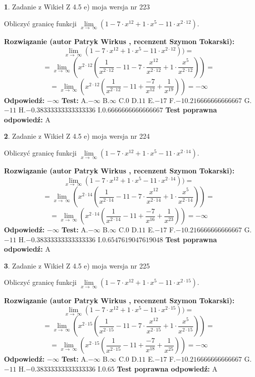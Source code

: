 \documentclass[12pt, a4paper]{article}
\theoremstyle{definition} %
\newtheorem{zad}{}
\newcommand{\zadStart}[1]{\begin{zad}#1\newline}
\newcommand{\zadStop}{\end{zad}}
\newcommand{\rozwStart}[2]{\noindent \textbf{Rozwiązanie (autor #1 , recenzent #2): }\newline}
\newcommand{\rozwStop}{\newline}
\newcommand{\odpStart}{\noindent \textbf{Odpowiedź:}\newline}
\newcommand{\odpStop}{\newline}
\newcommand{\testStart}{\noindent \textbf{Test:}\newline}
\newcommand{\testStop}{\newline}
\newcommand{\kluczStart}{\noindent \textbf{Test poprawna odpowiedź:}\newline}
\newcommand{\kluczStop}{\newline}
\begin{document}
\zadStart{Zadanie z Wikieł Z 4.5 e) moja wersja nr 223}


Obliczyć granicę funkcji  $\lim\limits_{x\to\ \infty}(1 - 7 \cdot x^{12}+1 \cdot x^{5}- 11 \cdot x^{2\cdot12})$.
\zadStop
\rozwStart{Patryk Wirkus}{Szymon Tokarski}
$$\lim\limits_{x\to\ \infty}(1 - 7 \cdot x^{12}+1 \cdot x^{5}- 11 \cdot x^{2\cdot12}))=$$
$$=\lim\limits_{x\to\ \infty}(x^{2\cdot12}(\frac{1}{x^{2\cdot12}}-11 -7 \cdot \frac{x^{12}}{x^{2\cdot12}}+1 \cdot \frac{x^{5}}{x^{2\cdot12}}))=$$
$$=\lim\limits_{x\to\ \infty}(x^{2\cdot12}(\frac{1}{x^{2\cdot12}}-11 + \frac{-7}{x^{12}}+ \frac{1}{x^{19}}))=-\infty$$
\rozwStop
\odpStart
$-\infty$
\odpStop
\testStart
A.$-\infty$ B.$\infty$ C.$0$ D.$11$ E.$-17$
F.$-10.216666666666667$ G.$-11$
H.$-0.38333333333333336$
I.$0.6666666666666667$
\testStop
\kluczStart
A
\kluczStop



\zadStart{Zadanie z Wikieł Z 4.5 e) moja wersja nr 224}


Obliczyć granicę funkcji  $\lim\limits_{x\to\ \infty}(1 - 7 \cdot x^{12}+1 \cdot x^{5}- 11 \cdot x^{2\cdot14})$.
\zadStop
\rozwStart{Patryk Wirkus}{Szymon Tokarski}
$$\lim\limits_{x\to\ \infty}(1 - 7 \cdot x^{12}+1 \cdot x^{5}- 11 \cdot x^{2\cdot14}))=$$
$$=\lim\limits_{x\to\ \infty}(x^{2\cdot14}(\frac{1}{x^{2\cdot14}}-11 -7 \cdot \frac{x^{12}}{x^{2\cdot14}}+1 \cdot \frac{x^{5}}{x^{2\cdot14}}))=$$
$$=\lim\limits_{x\to\ \infty}(x^{2\cdot14}(\frac{1}{x^{2\cdot14}}-11 + \frac{-7}{x^{16}}+ \frac{1}{x^{23}}))=-\infty$$
\rozwStop
\odpStart
$-\infty$
\odpStop
\testStart
A.$-\infty$ B.$\infty$ C.$0$ D.$11$ E.$-17$
F.$-10.216666666666667$ G.$-11$
H.$-0.38333333333333336$
I.$0.6547619047619048$
\testStop
\kluczStart
A
\kluczStop



\zadStart{Zadanie z Wikieł Z 4.5 e) moja wersja nr 225}


Obliczyć granicę funkcji  $\lim\limits_{x\to\ \infty}(1 - 7 \cdot x^{12}+1 \cdot x^{5}- 11 \cdot x^{2\cdot15})$.
\zadStop
\rozwStart{Patryk Wirkus}{Szymon Tokarski}
$$\lim\limits_{x\to\ \infty}(1 - 7 \cdot x^{12}+1 \cdot x^{5}- 11 \cdot x^{2\cdot15}))=$$
$$=\lim\limits_{x\to\ \infty}(x^{2\cdot15}(\frac{1}{x^{2\cdot15}}-11 -7 \cdot \frac{x^{12}}{x^{2\cdot15}}+1 \cdot \frac{x^{5}}{x^{2\cdot15}}))=$$
$$=\lim\limits_{x\to\ \infty}(x^{2\cdot15}(\frac{1}{x^{2\cdot15}}-11 + \frac{-7}{x^{18}}+ \frac{1}{x^{25}}))=-\infty$$
\rozwStop
\odpStart
$-\infty$
\odpStop
\testStart
A.$-\infty$ B.$\infty$ C.$0$ D.$11$ E.$-17$
F.$-10.216666666666667$ G.$-11$
H.$-0.38333333333333336$
I.$0.65$
\testStop
\kluczStart
A
\kluczStop
\end{document}
